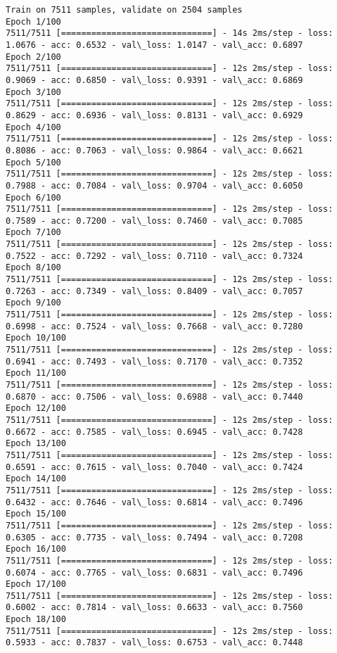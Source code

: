 \documentclass[11pt]{article}
\begin{document}
    \begin{Verbatim}[commandchars=\\\{\}]
Train on 7511 samples, validate on 2504 samples
Epoch 1/100
7511/7511 [==============================] - 14s 2ms/step - loss: 1.0676 - acc: 0.6532 - val\_loss: 1.0147 - val\_acc: 0.6897
Epoch 2/100
7511/7511 [==============================] - 12s 2ms/step - loss: 0.9069 - acc: 0.6850 - val\_loss: 0.9391 - val\_acc: 0.6869
Epoch 3/100
7511/7511 [==============================] - 12s 2ms/step - loss: 0.8629 - acc: 0.6936 - val\_loss: 0.8131 - val\_acc: 0.6929
Epoch 4/100
7511/7511 [==============================] - 12s 2ms/step - loss: 0.8086 - acc: 0.7063 - val\_loss: 0.9864 - val\_acc: 0.6621
Epoch 5/100
7511/7511 [==============================] - 12s 2ms/step - loss: 0.7988 - acc: 0.7084 - val\_loss: 0.9704 - val\_acc: 0.6050
Epoch 6/100
7511/7511 [==============================] - 12s 2ms/step - loss: 0.7589 - acc: 0.7200 - val\_loss: 0.7460 - val\_acc: 0.7085
Epoch 7/100
7511/7511 [==============================] - 12s 2ms/step - loss: 0.7522 - acc: 0.7292 - val\_loss: 0.7110 - val\_acc: 0.7324
Epoch 8/100
7511/7511 [==============================] - 12s 2ms/step - loss: 0.7263 - acc: 0.7349 - val\_loss: 0.8409 - val\_acc: 0.7057
Epoch 9/100
7511/7511 [==============================] - 12s 2ms/step - loss: 0.6998 - acc: 0.7524 - val\_loss: 0.7668 - val\_acc: 0.7280
Epoch 10/100
7511/7511 [==============================] - 12s 2ms/step - loss: 0.6941 - acc: 0.7493 - val\_loss: 0.7170 - val\_acc: 0.7352
Epoch 11/100
7511/7511 [==============================] - 12s 2ms/step - loss: 0.6870 - acc: 0.7506 - val\_loss: 0.6988 - val\_acc: 0.7440
Epoch 12/100
7511/7511 [==============================] - 12s 2ms/step - loss: 0.6672 - acc: 0.7585 - val\_loss: 0.6945 - val\_acc: 0.7428
Epoch 13/100
7511/7511 [==============================] - 12s 2ms/step - loss: 0.6591 - acc: 0.7615 - val\_loss: 0.7040 - val\_acc: 0.7424
Epoch 14/100
7511/7511 [==============================] - 12s 2ms/step - loss: 0.6432 - acc: 0.7646 - val\_loss: 0.6814 - val\_acc: 0.7496
Epoch 15/100
7511/7511 [==============================] - 12s 2ms/step - loss: 0.6305 - acc: 0.7735 - val\_loss: 0.7494 - val\_acc: 0.7208
Epoch 16/100
7511/7511 [==============================] - 12s 2ms/step - loss: 0.6074 - acc: 0.7765 - val\_loss: 0.6831 - val\_acc: 0.7496
Epoch 17/100
7511/7511 [==============================] - 12s 2ms/step - loss: 0.6002 - acc: 0.7814 - val\_loss: 0.6633 - val\_acc: 0.7560
Epoch 18/100
7511/7511 [==============================] - 12s 2ms/step - loss: 0.5933 - acc: 0.7837 - val\_loss: 0.6753 - val\_acc: 0.7448

\end{Verbatim}
\end{document}
